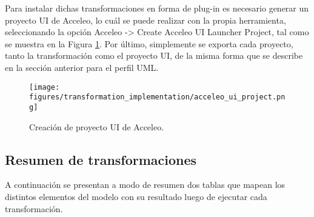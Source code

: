 Para instalar dichas transformaciones en forma de plug-in es necesario generar un proyecto UI de Acceleo, lo cuál se puede realizar con la propia herramienta, seleccionando la opción Acceleo -> Create Acceleo UI Launcher Project, tal como se muestra en la Figura \ref{fig:transformation:acceleo_ui_project}. Por último, simplemente se exporta cada proyecto, tanto la transformación como el proyecto UI, de la misma forma que se describe en la sección anterior para el perfil UML.

\begin{figure}[htbp]
    \centering
    \texttt{[image: figures/transformation\_implementation/acceleo\_ui\_project.png]}
    \caption{Creación de proyecto UI de Acceleo.}
    \label{fig:transformation:acceleo_ui_project}
\end{figure}

\subsection{Resumen de transformaciones}

A continuación se presentan a modo de resumen dos tablas que mapean los distintos elementos del modelo con su resultado luego de ejecutar cada transformación.

